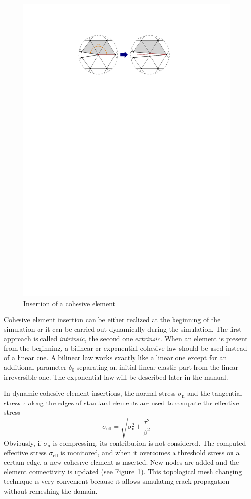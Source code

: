 \begin{figure}
  \centering
  \includegraphics[width=.9\textwidth]{figures/insertion}
  \caption{Insertion of a cohesive element.}
  \label{fig:smm:coh:insertion}
\end{figure}

Cohesive element insertion can be either realized at the beginning of
the simulation or it can be carried out dynamically during the
simulation. The first approach is called \emph{intrinsic}, the
second one \emph{extrinsic}. When an element is present from the
beginning, a bilinear or exponential cohesive law should be used
instead of a linear one. A bilinear law works exactly like a linear
one except for an additional parameter $\delta_0$ separating an
initial linear elastic part from the linear irreversible one. The
exponential law will be described later in the manual.

In dynamic cohesive element insertions, the normal stress
$\sigma_\mathrm{n}$ and the tangential stress $\tau$ along the edges
of standard elements are used to compute the effective stress
\begin{equation}
  \sigma_\mathrm{eff} = \sqrt{\sigma_\mathrm{n}^2 +
    \frac{\tau^2}{\beta^2}}
\end{equation}
Obviously, if $\sigma_\mathrm{n}$ is compressing, its contribution is
not considered. The computed effective stress $\sigma_\mathrm{eff}$ is
monitored, and when it overcomes a threshold stress on a certain edge,
a new cohesive element is inserted. New nodes are added and the
element connectivity is updated (see
Figure~\ref{fig:smm:coh:insertion}). This topological mesh changing
technique is very convenient because it allows simulating crack
propagation without remeshing the domain.

